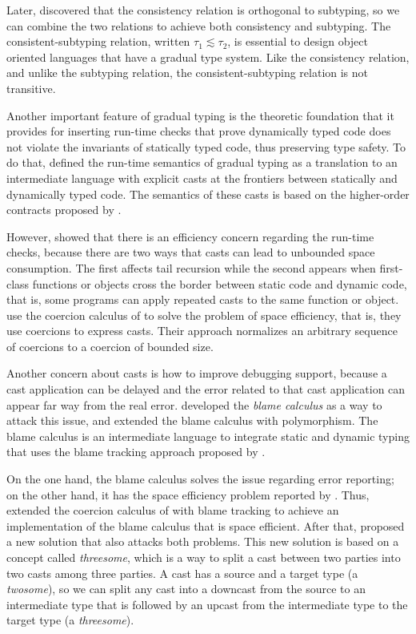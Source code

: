 \documentclass[preprint]{sig-alternate}
\begin{document}
Later, \cite{siek2007objects} discovered that the consistency relation
is orthogonal to subtyping, so we can combine the two relations to
achieve both consistency and subtyping.
The consistent-subtyping relation,
written $\tau_{1} \lesssim \tau_{2}$,
is essential to design object oriented languages that have a
gradual type system.
Like the consistency relation, and unlike the subtyping relation,
the consistent-subtyping relation is not transitive.

Another important feature of gradual typing is the theoretic
foundation that it provides for inserting run-time checks that
prove dynamically typed code does not violate the invariants of
statically typed code, thus preserving type safety.
To do that, \cite{siek2006gradual} defined the run-time semantics
of gradual typing as a translation to an intermediate language with
explicit casts at the frontiers between statically and dynamically
typed code.
The semantics of these casts is based on the higher-order contracts
proposed by \cite{findler2002chf}.

However, \cite{herman2007sgt} showed that there is an efficiency
concern regarding the run-time checks, because there are two
ways that casts can lead to unbounded space consumption.
The first affects tail recursion while the second appears when
first-class functions or objects cross the border between
static code and dynamic code, that is, some programs can apply
repeated casts to the same function or object.
\cite{herman2007sgt} use the coercion calculus of
\cite{henglein1994dts} to solve the problem of space efficiency,
that is, they use coercions to express casts.
Their approach normalizes an arbitrary sequence of coercions to a
coercion of bounded size.

Another concern about casts is how to improve debugging support,
because a cast application can be delayed and the error related
to that cast application can appear far way from the real error.
\cite{wadler2009wpc} developed the \textit{blame calculus} as a way
to attack this issue, and \cite{ahmed2011bfa} extended the
blame calculus with polymorphism.
The blame calculus is an intermediate language to integrate
static and dynamic typing that uses the blame tracking approach
proposed by \cite{findler2002chf}.

On the one hand, the blame calculus solves the issue regarding
error reporting;
on the other hand, it has the space efficiency problem reported
by \cite{herman2007sgt}.
Thus, \cite{siek2009casts} extended the coercion calculus of
\cite{herman2007sgt} with blame tracking to achieve an
implementation of the blame calculus that is space efficient.
After that, \cite{siek2010blame} proposed a new solution that also
attacks both problems.
This new solution is based on a concept called \textit{threesome},
which is a way to split a cast between two parties into two casts
among three parties.
A cast has a source and a target type (a \textit{twosome}),
so we can split any cast into a downcast from the source to an
intermediate type that is followed by an upcast from the intermediate
type to the target type (a \textit{threesome}).
\end{document}
